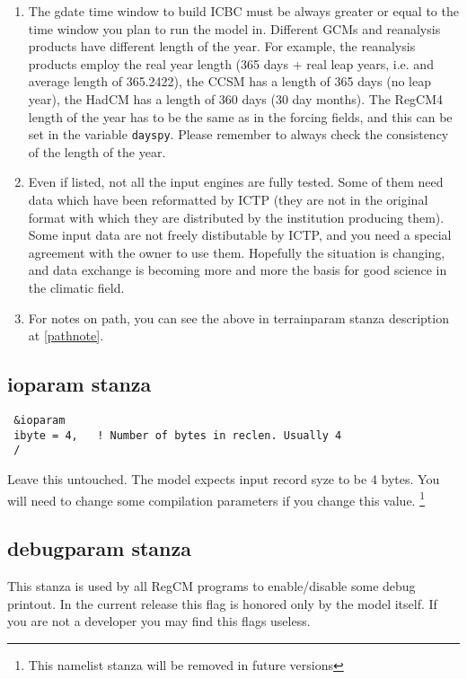 \begin{enumerate}
\item The gdate time window to build ICBC must be always greater or equal to
the time window you plan to run the model in.
Different GCMs and reanalysis products have different length of the year.
For example, the reanalysis products employ the real year length (365 days +
real leap years, i.e. and average length of 365.2422), the CCSM has a length
of 365 days (no leap year), the HadCM has a length of 360 days (30 day months).
The RegCM4 length of the year has to be the same as in the forcing fields, and
this can be set in the variable \verb=dayspy=.
Please remember to always check the consistency of the length of the year.
\item Even if listed, not all the input engines are fully tested. Some of them
need data which have been reformatted by ICTP (they are not in the original
format with which they are distributed by the institution producing them).
Some input data are not freely distibutable by ICTP, and you need a special
agreement with the owner to use them.
Hopefully the situation is changing, and data exchange is becoming more and more
the basis for good science in the climatic field.
\item For notes on path, you can see the above in terrainparam stanza
description at \ref{pathnote}.
\end{enumerate}

\subsection{ioparam stanza}

{\footnotesize
\begin{Verbatim}
 &ioparam
 ibyte = 4,   ! Number of bytes in reclen. Usually 4
 /
\end{Verbatim}
}

Leave this untouched. The model expects input record syze to be 4 bytes.
You will need to change some compilation parameters if you change this value.
\footnote{This namelist stanza will be removed in future versions}

\subsection{debugparam stanza}

This stanza is used by all RegCM programs to enable/disable some debug printout.
In the current release this flag is honored only by the model itself. If you
are not a developer you may find this flags useless.

